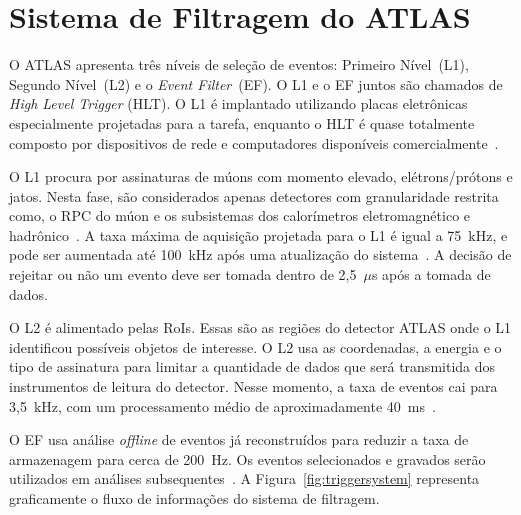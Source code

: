 
\chapter{Sistema de Filtragem do ATLAS}

O ATLAS apresenta três níveis de seleção de eventos: Primeiro Nível~(L1),
Segundo Nível~(L2) e o \emph{Event Filter}~(EF). O L1 e o EF juntos são chamados
de \emph{High Level Trigger} (HLT). O L1 é implantado utilizando placas
eletrônicas especialmente projetadas para a tarefa, enquanto o HLT é quase 
totalmente composto por dispositivos de rede e computadores disponíveis
comercialmente~\cite{ref:2010performance}.

O L1 procura por assinaturas de múons com momento elevado, elétrons/prótons e
jatos. Nesta fase, são considerados apenas detectores com granularidade restrita
como, o RPC do múon e os subsistemas dos calorímetros eletromagnético e
hadrônico~\cite{LEVEL1TRIGGER}. A taxa máxima de aquisição projetada para o L1 é
igual a 75~kHz, e pode ser aumentada até 100~kHz após uma atualização do
sistema~\cite{ATLAS2008}. A decisão de rejeitar ou não um evento deve ser tomada
dentro de 2,5~$\mu$s após a tomada de dados.

O L2 é alimentado pelas RoIs. Essas são as regiões do detector ATLAS onde o L1
identificou possíveis objetos de interesse. O L2 usa as coordenadas, a energia e
o tipo de assinatura para limitar a quantidade de dados que será transmitida
dos instrumentos de leitura do detector. Nesse momento, a taxa de eventos cai
para 3,5~kHz, com um processamento médio de aproximadamente
40~ms~\cite{ATLAS2008}.

O EF usa análise \emph{offline} de eventos já reconstruídos para reduzir a taxa
de armazenagem para cerca de 200~Hz. Os eventos selecionados e gravados serão
utilizados em análises subsequentes~\cite{ARMSTRONG2004}. A
Figura~\ref{fig:triggersystem} representa graficamente o fluxo de informações do
sistema de filtragem.

